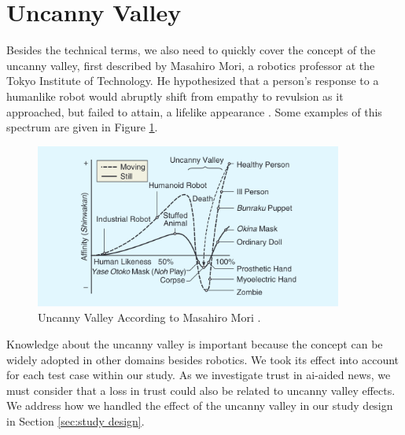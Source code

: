 \documentclass[
  a4paper,  %
  twoside,  %
  bibliography=totoc,
  headsepline,
  cleardoublepage=empty,
  parskip=half,
  draft=false
]{scrbook}
\begin{document}
\section{Uncanny Valley}
Besides the technical terms, we also need to quickly cover the concept of the uncanny valley, first described by Masahiro Mori, a robotics professor at the Tokyo Institute of Technology. He hypothesized that a person's response to a humanlike robot would abruptly shift from empathy to revulsion as it approached, but failed to attain, a lifelike appearance \cite{moriUncannyValleyField2012}. Some examples of this spectrum are given in Figure \ref{fig:uncanny-valley}.

\begin{figure}[h]
  \centering
  \includegraphics[width=0.9\textwidth]{./graphics/uncanny-valley.png}
  \caption{Uncanny Valley According to Masahiro Mori \cite{moriUncannyValleyField2012}.}
  \label{fig:uncanny-valley}
\end{figure}

Knowledge about the uncanny valley is important because the concept can be widely adopted in other domains besides robotics. We took its effect into account for each test case within our study. As we investigate trust in \gls{ai}-aided news, we must consider that a loss in trust could also be related to uncanny valley effects. \\
We address how we handled the effect of the uncanny valley in our study design in Section \ref{sec:study design}.
\end{document}

